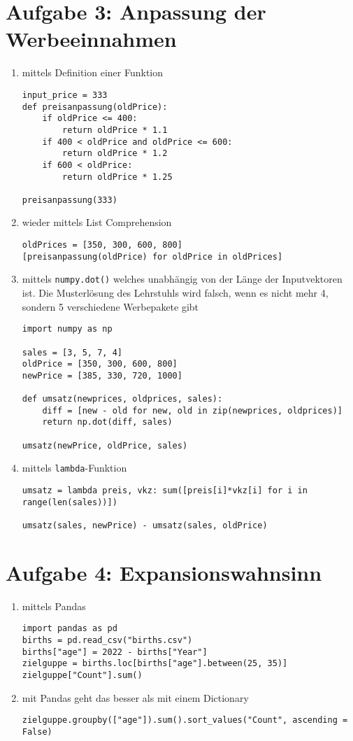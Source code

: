 \documentclass{article}
\begin{document}
	\section*{Aufgabe 3: Anpassung der Werbeeinnahmen}
	\begin{enumerate}[label=(\alph*)]
		\item mittels Definition einer Funktion
		\begin{lstlisting}
input_price = 333
def preisanpassung(oldPrice):
	if oldPrice <= 400:
		return oldPrice * 1.1
	if 400 < oldPrice and oldPrice <= 600:
		return oldPrice * 1.2
	if 600 < oldPrice:
		return oldPrice * 1.25

preisanpassung(333)
		\end{lstlisting}
		\item wieder mittels List Comprehension
		\begin{lstlisting}
oldPrices = [350, 300, 600, 800]
[preisanpassung(oldPrice) for oldPrice in oldPrices]
		\end{lstlisting}
		\item mittels \texttt{numpy.dot()} welches unabhängig von der Länge der Inputvektoren ist. Die Musterlösung des Lehrstuhls wird falsch, wenn es nicht mehr 4, sondern 5 verschiedene Werbepakete gibt
		\begin{lstlisting}
import numpy as np

sales = [3, 5, 7, 4]
oldPrice = [350, 300, 600, 800]
newPrice = [385, 330, 720, 1000]

def umsatz(newprices, oldprices, sales):
	diff = [new - old for new, old in zip(newprices, oldprices)]
	return np.dot(diff, sales)

umsatz(newPrice, oldPrice, sales)
		\end{lstlisting}
		\item mittels \texttt{lambda}-Funktion
		\begin{lstlisting}
umsatz = lambda preis, vkz: sum([preis[i]*vkz[i] for i in range(len(sales))])

umsatz(sales, newPrice) - umsatz(sales, oldPrice)
		\end{lstlisting}
	\end{enumerate}
	
	\section*{Aufgabe 4: Expansionswahnsinn}
	\begin{enumerate}[label=(\alph*)]
		\item mittels Pandas
		\begin{lstlisting}
import pandas as pd
births = pd.read_csv("births.csv")
births["age"] = 2022 - births["Year"]
zielguppe = births.loc[births["age"].between(25, 35)]
zielguppe["Count"].sum()
		\end{lstlisting}
		\item mit Pandas geht das besser als mit einem Dictionary
		\begin{lstlisting}
zielguppe.groupby(["age"]).sum().sort_values("Count", ascending = False)
		\end{lstlisting}
	\end{enumerate}
\end{document}
